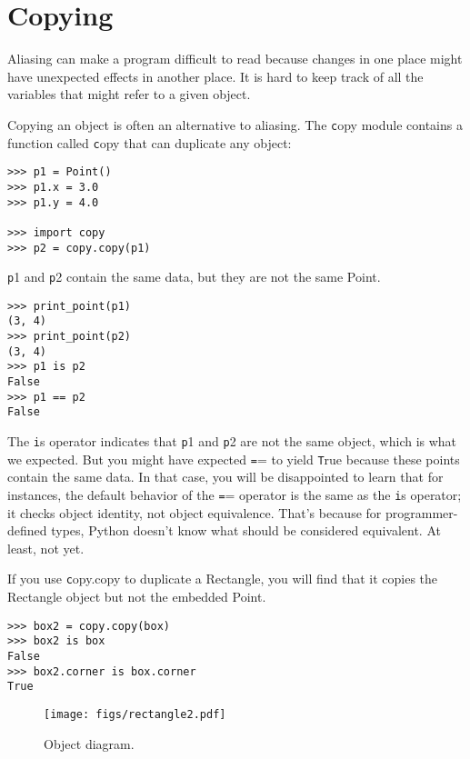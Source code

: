 \documentclass[
DIV=11,
fontsize=12,
twoside,
headinclude=false,
titlepage=firstiscover,
abstract=true,
headsepline=true,
footsepline=true,
chapterprefix=true, %
headings=big,
bibliography=totoc,%
captions=tableheading
]{scrbook}
\theoremstyle{definition}
\begin{document}
\section{Copying}
\label{copying}

Aliasing can make a program difficult to read because changes
in one place might have unexpected effects in another place.
It is hard to keep track of all the variables that might refer
to a given object.

Copying an object is often an alternative to aliasing.
The {\texttt copy} module contains a function called {\texttt copy} that
can duplicate any object:

\begin{lstlisting}
>>> p1 = Point()
>>> p1.x = 3.0
>>> p1.y = 4.0

>>> import copy
>>> p2 = copy.copy(p1)
\end{lstlisting}
%
{\texttt p1} and {\texttt p2} contain the same data, but they are
not the same Point.

\begin{lstlisting}
>>> print_point(p1)
(3, 4)
>>> print_point(p2)
(3, 4)
>>> p1 is p2
False
>>> p1 == p2
False
\end{lstlisting}
%
The {\texttt is} operator indicates that {\texttt p1} and {\texttt p2} are not the
same object, which is what we expected.  But you might have expected
{\texttt ==} to yield {\texttt True} because these points contain the same
data.  In that case, you will be disappointed to learn that for
instances, the default behavior of the {\texttt ==} operator is the same
as the {\texttt is} operator; it checks object identity, not object
equivalence.  That's because for programmer-defined types, Python doesn't
know what should be considered equivalent.  At least, not yet.

If you use {\texttt copy.copy} to duplicate a Rectangle, you will find
that it copies the Rectangle object but not the embedded Point.

\begin{lstlisting}
>>> box2 = copy.copy(box)
>>> box2 is box
False
>>> box2.corner is box.corner
True
\end{lstlisting}

\begin{figure}
\centerline
{\texttt{[image: figs/rectangle2.pdf]}}
\caption{Object diagram.}
\label{fig.rectangle2}
\end{figure}
\end{document}
